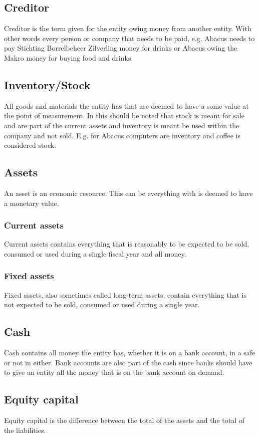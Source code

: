 \documentclass{report}
\begin{document}
\subsection{Creditor}
Creditor is the term given for the entity owing money from another entity. With other words every person or company that needs to be paid, e.g. Abacus needs to pay Stichting Borrelbeheer Zilverling money for drinks or Abacus owing the Makro money for buying food and drinks. 
\subsection{Inventory/Stock}
All goods and materials the entity has that are deemed to have a some value at the point of measurement. In this should be noted that stock is meant for sale and are part of the current assets and inventory is meant be used within the company and not sold. E.g. for Abacus computers are inventory and coffee is considered stock. 
\subsection{Assets}
An asset is an economic resource. This can be everything with is deemed to have a monetary value. 
\subsubsection{Current assets}
Current assets contains everything that is reasonably to be expected to be sold, consumed or used during a single fiscal year and all money.   
\subsubsection{Fixed assets}
Fixed assets, also sometimes called long-term assets, contain everything that is not expected to be sold, consumed or used during a single year. 
\subsection{Cash}
Cash contains all money the entity has, whether it is on a bank account, in a safe or not in either. Bank accounts are also part of the cash since banks should have to give an entity all the money that is on the bank account on demand. 
\subsection{Equity capital}
Equity capital is the difference between the total of the assets and the total of the liabilities.
\end{document}
